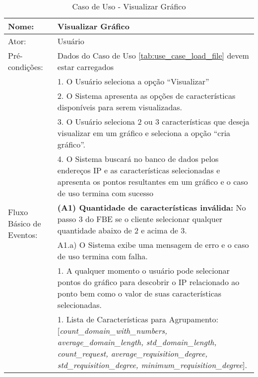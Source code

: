 \begin{table}[]
\centering
\caption{Caso de Uso - Visualizar Gráfico}
\label{tab:use_case_visualize}
\begin{tabular}{|lp{10cm}|}
\hline
Nome: & Visualizar Gráfico  \\ \hline
Ator: & Usuário   \\ \hline
Pré-condições: & Dados do Caso de Uso \ref{tab:use_case_load_file} devem estar carregados  \\ \hline
\multirow{10}{*}{Fluxo Básico de Eventos:} & 1. O Usuário seleciona a opção ``Visualizar''  \\
 & 2. O Sistema apresenta as opções de características disponíveis para serem visualizadas. \\
 & 3. O Usuário seleciona 2 ou 3 características que deseja visualizar em um gráfico e seleciona a opção ``cria gráfico''. \\
 & 4. O Sistema buscará no banco de dados pelos endereços IP e as características selecionadas e apresenta os pontos resultantes em um gráfico e o caso de uso termina com sucesso  \\
 \hline
\multirow{5}{*}{Fluxo Alternativo de Eventos:} & \textbf{(A1) Quantidade de características inválida:} No passo 3 do FBE se o cliente selecionar qualquer quantidade abaixo de 2 e acima de 3.\\
 & A1.a) O Sistema exibe uma mensagem de erro e o caso de uso termina com falha.\\
 \hline
\multirow{3}{*}{Pós-Condições:} & 1. A qualquer momento o usuário pode selecionar pontos do gráfico para descobrir o IP relacionado ao ponto bem como o valor de suas características selecionadas. \\
\hline
\multirow{5}{*}{Outras Informações:} & 1. Lista de Características para Agrupamento: [\textit{count\_domain\_with\_numbers, average\_domain\_length, std\_domain\_length, count\_request, average\_requisition\_degree, std\_requisition\_degree, minimum\_requisition\_degree}].  \\
\hline 
\end{tabular}
\end{table}

